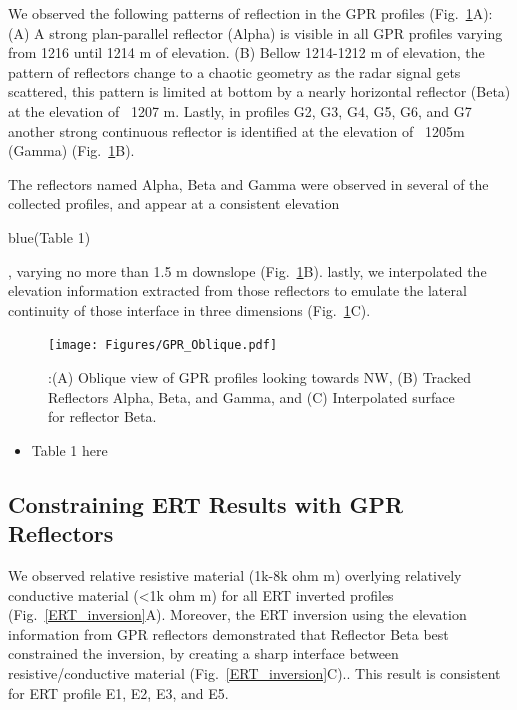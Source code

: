 \documentclass[5p]{elsarticle}
\newcommand{\COMON}{\begin{color}{blue}}
\newcommand{\COMOFF}{\end{color}}
\begin{document}
We observed the following patterns of reflection in the GPR profiles (Fig.~\ref{GPR_Oblique}A): (A) A strong plan-parallel reflector (Alpha) is visible in all GPR profiles varying from 1216 until 1214 m of elevation. (B) Bellow 1214-1212 m of elevation, the pattern of reflectors change to a chaotic geometry as the radar signal gets scattered, this pattern is limited at bottom  by a nearly horizontal reflector (Beta)  at the elevation of ~1207 m. Lastly, in profiles G2,  G3, G4, G5, G6, and G7 another strong continuous reflector is identified at the elevation of ~1205m (Gamma) (Fig.~\ref{GPR_Oblique}B). 

The reflectors named Alpha, Beta and Gamma were observed in several of the collected profiles, and appear at a consistent elevation \COMON (Table 1) \COMOFF, varying no more than 1.5 m downslope (Fig.~\ref{GPR_Oblique}B). lastly, we interpolated the elevation information extracted from those reflectors to emulate the lateral continuity of those interface in three dimensions (Fig.~\ref{GPR_Oblique}C).  


								 \begin{figure}[h]

	\texttt{[image: Figures/GPR\_Oblique.pdf]}
		\caption{:(A) Oblique view of GPR profiles looking towards NW, (B) Tracked Reflectors Alpha, Beta, and Gamma, and (C) Interpolated surface for reflector Beta. \label{GPR_Oblique}}

								   \end{figure}
								   
\begin{itemize}
    \item Table 1 here
\end{itemize}			   

								   
\subsection{Constraining ERT Results with GPR Reflectors}

We observed relative resistive material (1k-8k ohm m) overlying relatively conductive material (<1k ohm m) for all ERT inverted profiles (Fig.~\ref{ERT_inversion}A). Moreover, the ERT inversion using the elevation information from GPR reflectors demonstrated that Reflector Beta best constrained the inversion, by creating a sharp interface between resistive/conductive material (Fig.~\ref{ERT_inversion}C).. This result is consistent for ERT profile E1, E2, E3, and E5. 
\end{document}
